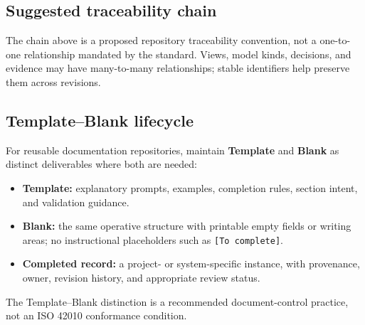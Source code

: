\documentclass[11pt,letterpaper,oneside]{article}
\newcommand{\term}[1]{\textbf{\color{Navy}#1}}
\begin{document}
\subsection{Suggested traceability chain}
\begin{center}
\end{center}
The chain above is a proposed repository traceability convention, not a one-to-one relationship mandated by the standard. Views, model kinds, decisions, and evidence may have many-to-many relationships; stable identifiers help preserve them across revisions.

\subsection{Template--Blank lifecycle}
For reusable documentation repositories, maintain \term{Template} and \term{Blank} as distinct deliverables where both are needed:
\begin{itemize}
\item \textbf{Template:} explanatory prompts, examples, completion rules, section intent, and validation guidance.
\item \textbf{Blank:} the same operative structure with printable empty fields or writing areas; no instructional placeholders such as \texttt{[To complete]}.
\item \textbf{Completed record:} a project- or system-specific instance, with provenance, owner, revision history, and appropriate review status.
\end{itemize}
The Template--Blank distinction is a recommended document-control practice, not an ISO 42010 conformance condition.
\end{document}

